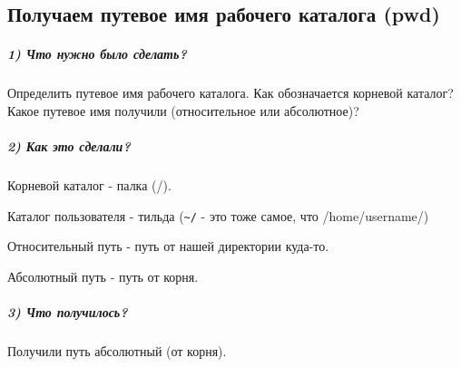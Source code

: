 \subsection{Получаем путевое имя рабочего каталога (pwd)}

\subparagraph{1) Что нужно было сделать?}

Определить путевое имя рабочего каталога. Как обозначается корневой каталог? Какое путевое имя получили (относительное или абсолютное)?

\subparagraph{2) Как это сделали?}


Корневой каталог - палка (/).

Каталог пользователя - тильда (\verb|~/| - это тоже самое, что /home/username/)

Относительный путь - путь от нашей директории куда-то.

Абсолютный путь - путь от корня.

\subparagraph{3) Что получилось?}

Получили путь абсолютный (от корня).
